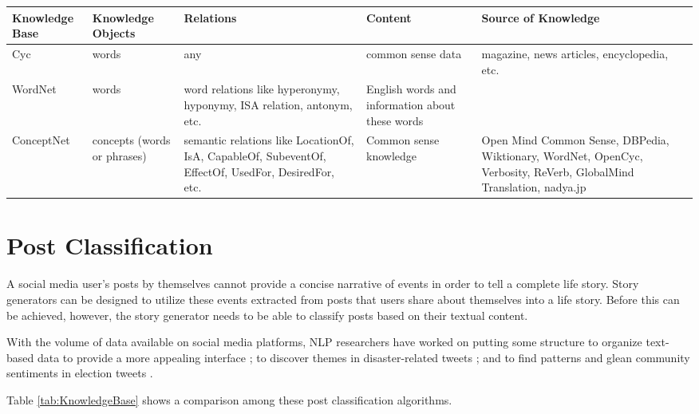 \clearpage
\begin{sidewaystable}[ph!]   %
	\centering
	\caption{Comparison among the different knowledge base systems.} \vspace{0.25em}
	\begin{tabular}{|p{1.5in}|p{1.5in}|p{1.5in}|p{1.5in}|p{1.5in}|} \hline
		\centering Knowledge Base & Knowledge Objects & Relations & Content & Source of Knowledge \\ \hline
		Cyc & words & any & common sense data & magazine, news articles, encyclopedia, etc. \\ \hline
		WordNet & words & word relations like hyperonymy, hyponymy, ISA relation, antonym, etc. & English words and information about these words & \\ \hline
		ConceptNet & concepts (words or phrases) & semantic relations like LocationOf, IsA, CapableOf, SubeventOf, EffectOf, UsedFor, DesiredFor, etc. & Common sense knowledge & Open Mind Common Sense, DBPedia, Wiktionary, WordNet, OpenCyc, Verbosity, ReVerb, GlobalMind Translation, nadya.jp \\ \hline
	\end{tabular}
	\label{tab:KnowledgeBase}
\end{sidewaystable}
\clearpage

\section{Post Classification}
A social media user's posts by themselves cannot provide a concise narrative of events in order to tell a complete life story. Story generators can be designed to utilize these events extracted from posts that users share about themselves into a life story. Before this can be achieved, however, the story generator needs to be able to classify posts based on their textual content.

With the volume of data available on social media platforms, NLP researchers have worked on putting some structure to organize text-based data to provide a more appealing interface \cite{setty2014classification}; to discover themes in disaster-related tweets \cite{syliongka2015combining}; and to find patterns and glean community sentiments in election tweets \cite{wang2012system}.

Table \ref{tab:KnowledgeBase} shows a comparison among these post classification algorithms.


